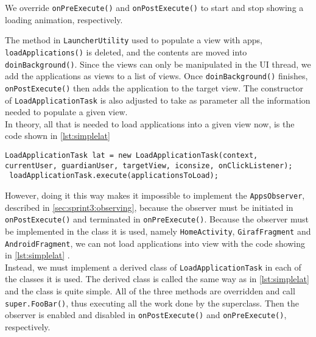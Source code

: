 We override \lstinline!onPreExecute()! and \lstinline!onPostExecute()! to start and stop showing a loading animation, respectively.

The method in \lstinline!LauncherUtility! used to populate a view with apps, \lstinline!loadApplications()! is deleted, and the contents are moved into \lstinline!doinBackground()!.
Since the views can only be manipulated in the UI thread, we add the applications as views to a list of views.
Once \lstinline!doinBackground()! finishes, \lstinline!onPostExecute()! then adds the application to the target view. 
 The constructor of \lstinline!LoadApplicationTask! is also adjusted to take as parameter all the information needed to populate a given view.\\
 
 In theory, all that is needed to load applications into a given view now, is the code shown in \cref{lst:simplelat} 
 
 \begin{lstlisting}[caption={The simple way of implementing LoadApplicationTask.}, label={lst:simplelat}]
 LoadApplicationTask lat = new LoadApplicationTask(context, currentUser, guardianUser, targetView, iconsize, onClickListener);
 loadApplicationTask.execute(applicationsToLoad);
 \end{lstlisting}
 
 However, doing it this way makes it impossible to implement the \lstinline!AppsObserver!, described in \cref{sec:sprint3:observing}, because the observer must be initiated in \lstinline!onPostExecute()! and terminated in \lstinline!onPreExecute()!.
 Because the observer must be implemented in the class it is used, namely \lstinline!HomeActivity!, \lstinline!GirafFragment! and \lstinline!AndroidFragment!, we can not  load applications into view with the code showing in \cref{lst:simplelat} .\\
 
 Instead, we must implement a derived class of \lstinline|LoadApplicationTask| in each of the classes it is used.
 The derived class is called the same way as in \cref{lst:simplelat} and the class is quite simple.
 All of the three methods are overridden and call \lstinline!super.FooBar()!, thus executing all the work done by the superclass.
 Then the observer is enabled and disabled in  \lstinline!onPostExecute()! and \lstinline!onPreExecute()!, respectively.\\
 
